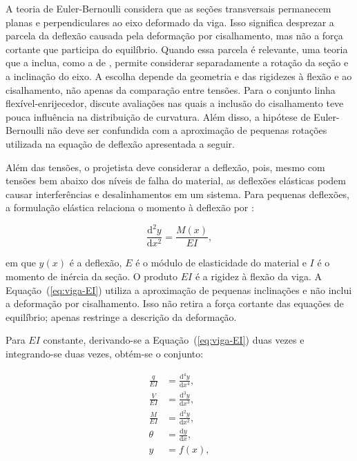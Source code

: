 \documentclass[arial,centeredequations,english,brazilian,oneside,section=TITLE]{ifes8}
\begin{document}
A teoria de Euler-Bernoulli considera que as seções transversais permanecem planas e
perpendiculares ao eixo deformado da viga. Isso significa desprezar a parcela da deflexão
causada pela deformação por cisalhamento, mas não a força cortante que participa do equilíbrio.
Quando essa parcela é relevante, uma teoria que a inclua, como a de , permite
considerar separadamente a rotação da seção e a inclinação do eixo. A escolha depende da
geometria e das rigidezes à flexão e ao cisalhamento, não apenas da comparação entre tensões.
Para o conjunto linha flexível-enrijecedor,  discute avaliações
nas quais a inclusão do cisalhamento teve pouca influência na distribuição de curvatura.
Além disso, a hipótese de Euler-Bernoulli não deve ser confundida com a aproximação de
pequenas rotações utilizada na equação de deflexão apresentada a seguir.

Além das tensões, o projetista deve considerar a deflexão, pois, mesmo com tensões
bem abaixo dos níveis de falha do material, as deflexões elásticas podem causar
interferências e desalinhamentos em um sistema. Para pequenas deflexões, a formulação
elástica relaciona o momento à deflexão por \cite{Norton2013}:

\begin{equation}
  \label{eq:viga-EI}
  \frac{\mathrm{d}^2 y}{\mathrm{d}x^2} = \frac{M(x)}{E I},
\end{equation}

em que $y(x)$ é a deflexão, $E$ é o módulo de elasticidade do material e $I$ é o
momento de inércia da seção. O produto $E I$ é a rigidez à flexão da viga. A
Equação~(\ref{eq:viga-EI}) utiliza a aproximação de pequenas inclinações e não inclui
a deformação por cisalhamento. Isso não retira a força cortante das equações de
equilíbrio; apenas restringe a descrição da deformação.

Para $EI$ constante, derivando-se a Equação~(\ref{eq:viga-EI}) duas vezes e
integrando-se duas vezes, obtém-se o conjunto:

\begin{align}
  \frac{q}{E I} &= \frac{\mathrm{d}^4 y}{\mathrm{d}x^4}, \label{eq:viga-q}\\
  \frac{V}{E I} &= \frac{\mathrm{d}^3 y}{\mathrm{d}x^3}, \label{eq:viga-V}\\
  \frac{M}{E I} &= \frac{\mathrm{d}^2 y}{\mathrm{d}x^2}, \label{eq:viga-M}\\
  \theta        &= \frac{\mathrm{d}y}{\mathrm{d}x}, \label{eq:viga-theta}\\
  y             &= f(x), \label{eq:viga-y}
\end{align}
\end{document}

